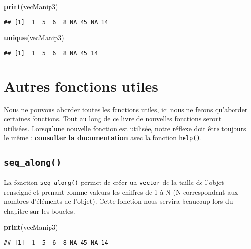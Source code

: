 \documentclass[]{book}
\newenvironment{Shaded}{\begin{snugshade}}{\end{snugshade}}
\newcommand{\KeywordTok}[1]{\textcolor[rgb]{0.13,0.29,0.53}{\textbf{#1}}}
\newcommand{\NormalTok}[1]{#1}
\theoremstyle{definition}
\theoremstyle{definition}
\theoremstyle{definition}
\theoremstyle{remark}
\begin{document}
\begin{Shaded}
\begin{Highlighting}[]
\KeywordTok{print}\NormalTok{(vecManip3)}
\end{Highlighting}
\end{Shaded}

\begin{verbatim}
## [1]  1  5  6  8 NA 45 NA 14
\end{verbatim}

\begin{Shaded}
\begin{Highlighting}[]
\KeywordTok{unique}\NormalTok{(vecManip3)}
\end{Highlighting}
\end{Shaded}

\begin{verbatim}
## [1]  1  5  6  8 NA 45 14
\end{verbatim}

\section{Autres fonctions utiles}\label{autres-fonctions-utiles}

Nous ne pouvons aborder toutes les fonctions utiles, ici nous ne ferons
qu'aborder certaines fonctions. Tout au long de ce livre de nouvelles
fonctions seront utilisées. Lorsqu'une nouvelle fonction est utilisée,
notre réflexe doit être toujours le même : \textbf{consulter la
documentation} avec la fonction \texttt{help()}.

\subsection{\texorpdfstring{\texttt{seq\_along()}}{seq\_along()}}\label{l015seqalong}

La fonction \texttt{seq\_along()} permet de créer un \texttt{vector} de
la taille de l'objet renseigné et prenant comme valeurs les chiffres de
1 à N (N correspondant aux nombres d'éléments de l'objet). Cette
fonction nous servira beaucoup lors du chapitre sur les boucles.

\begin{Shaded}
\begin{Highlighting}[]
\KeywordTok{print}\NormalTok{(vecManip3)}
\end{Highlighting}
\end{Shaded}

\begin{verbatim}
## [1]  1  5  6  8 NA 45 NA 14
\end{verbatim}
\end{document}
